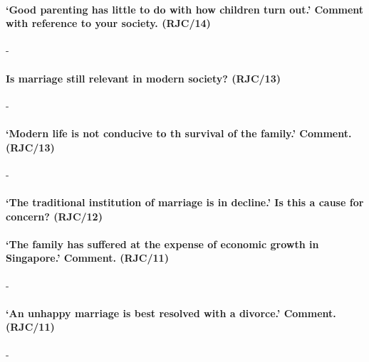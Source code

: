 \documentclass[../../main]{subfiles}
\begin{document}
\paragraph{`Good parenting has little to do with how children turn out.' Comment with reference to your society. (RJC/14)}-

\paragraph{Is marriage still relevant in modern society? (RJC/13)}-

\paragraph{`Modern life is not conducive to th survival of the family.' Comment. (RJC/13)}-

\paragraph{`The traditional institution of marriage is in decline.' Is this a cause for concern? (RJC/12)}

\paragraph{`The family has suffered at the expense of economic growth in Singapore.' Comment. (RJC/11)}-

\paragraph{`An unhappy marriage is best resolved with a divorce.' Comment. (RJC/11)}-
\end{document}
